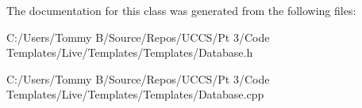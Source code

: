 The documentation for this class was generated from the following files\+:\begin{DoxyCompactItemize}
\item 
C\+:/\+Users/\+Tommy B/\+Source/\+Repos/\+U\+C\+C\+S/\+Pt 3/\+Code Templates/\+Live/\+Templates/\+Templates/Database.\+h\item 
C\+:/\+Users/\+Tommy B/\+Source/\+Repos/\+U\+C\+C\+S/\+Pt 3/\+Code Templates/\+Live/\+Templates/\+Templates/Database.\+cpp\end{DoxyCompactItemize}
